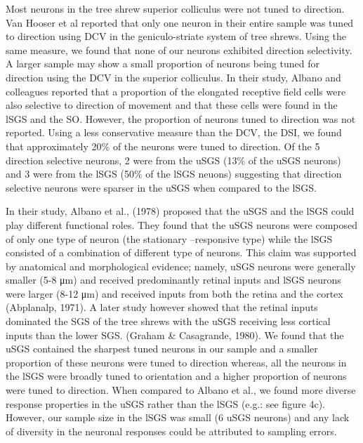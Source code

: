 Most neurons in the tree shrew superior colliculus were not tuned to
direction. Van Hooser et al reported that only one neuron in their
entire sample was tuned to direction using DCV in the geniculo-striate
system of tree shrews. Using the same measure, we found that none of our
neurons exhibited direction selectivity. A larger sample may show a
small proportion of neurons being tuned for direction using the DCV in
the superior colliculus. In their study, Albano and colleagues reported
that a proportion of the elongated receptive field cells were also
selective to direction of movement and that these cells were found in
the lSGS and the SO. However, the proportion of neurons tuned to
direction was not reported. Using a less conservative measure than the
DCV, the DSI, we found that approximately 20\% of the neurons were tuned
to direction. Of the 5 direction selective neurons, 2 were from the uSGS
(13\% of the uSGS neurons) and 3 were from the lSGS (50\% of the lSGS
neuons) suggesting that direction selective neurons were sparser in the
uSGS when compared to the lSGS.

In their study, Albano et al., (1978) proposed that the uSGS and the
lSGS could play different functional roles. They found that the uSGS
neurons were composed of only one type of neuron (the stationary
--responsive type) while the lSGS consisted of a combination of
different type of neurons. This claim was supported by anatomical and
morphological evidence; namely, uSGS neurons were generally smaller (5-8
μm) and received predominantly retinal inputs and lSGS neurons were
larger (8-12 μm) and received inputs from both the retina and the cortex
(Abplanalp, 1971). A later study however showed that the retinal inputs
dominated the SGS of the tree shrews with the uSGS receiving less
cortical inputs than the lower SGS. (Graham \& Casagrande, 1980). We
found that the uSGS contained the sharpest tuned neurons in our sample
and a smaller proportion of these neurons were tuned to direction
whereas, all the neurons in the lSGS were broadly tuned to orientation
and a higher proportion of neurons were tuned to direction. When
compared to Albano et al., we found more diverse response properties in
the uSGS rather than the lSGS (e.g.: see figure 4c). However, our sample
size in the lSGS was small (6 uSGS neurons) and any lack of diversity in
the neuronal responses could be attributed to sampling errors.


